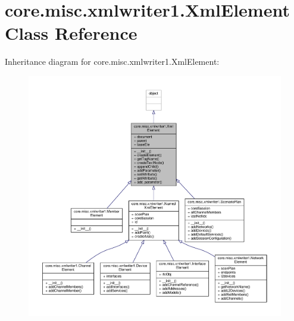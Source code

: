 \hypertarget{classcore_1_1misc_1_1xmlwriter1_1_1_xml_element}{\section{core.\+misc.\+xmlwriter1.\+Xml\+Element Class Reference}
\label{classcore_1_1misc_1_1xmlwriter1_1_1_xml_element}
}


Inheritance diagram for core.\+misc.\+xmlwriter1.\+Xml\+Element\+:
\nopagebreak
\begin{figure}[H]
\begin{center}
\leavevmode
\includegraphics[width=350pt]{classcore_1_1misc_1_1xmlwriter1_1_1_xml_element__inherit__graph}
\end{center}
\end{figure}



